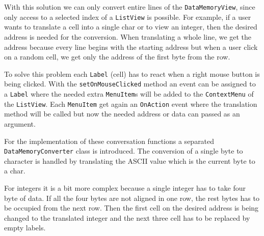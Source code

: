 With this solution we can only convert entire lines of the \texttt{DataMemoryView}, since only access to a selected index of a \texttt{ListView} is possible. For example, if a user wants to translate a cell into a single char or to view an integer, then the desired address is needed for the conversion. When translating a whole line, we get the address because every line begins with the starting address but when a user click on a random cell, we get only the address of the first byte from the row. 

To solve this problem each \texttt{Label} (cell) has to react when a right mouse button is being clicked. With the \texttt{setOnMouseClicked} method an event can be assigned to a \texttt{Label} where the needed extra \texttt{MenuItem}s will be added to the \texttt{ContextMenu} of the \texttt{ListView}. Each \texttt{MenuItem} get again an \texttt{OnAction} event where the translation method will be called but now the needed address or data can passed as an argument. 

For the implementation of these conversation functions a separated \texttt{DataMemoryConverter} class is introduced. The conversion of a single byte to character is handled by translating the ASCII value which is the current byte to a char. 

For integers it is a bit more complex because a single integer has to take four byte of data. If all the four bytes are not aligned in one row, the rest bytes has to be occupied from the next row. Then the first cell on the desired address is being changed to the translated integer and the next three cell has to be replaced by empty labels.
